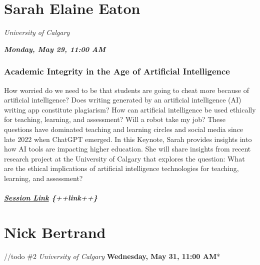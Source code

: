 \documentclass[
]{book}
\begin{document}
\hypertarget{sarah-elaine-eaton}{%
\section*{Sarah Elaine Eaton}\label{sarah-elaine-eaton}}

\emph{University of Calgary}

\textbf{\emph{Monday, May 29, 11:00 AM}}

\begin{keynote}
\hypertarget{academic-integrity-in-the-age-of-artificial-intelligence}{%
\subsubsection*{Academic Integrity in the Age of Artificial
Intelligence}\label{academic-integrity-in-the-age-of-artificial-intelligence}}

How worried do we need to be that students are going to cheat more
because of artificial intelligence? Does writing generated by an
artificial intelligence (AI) writing app constitute plagiarism? How can
artificial intelligence be used ethically for teaching, learning, and
assessment? Will a robot take my job? These questions have dominated
teaching and learning circles and social media since late 2022 when
ChatGPT emerged. In this Keynote, Sarah provides insights into how AI
tools are impacting higher education. She will share insights from
recent research project at the University of Calgary that explores the
question: What are the ethical implications of artificial intelligence
technologies for teaching, learning, and assessment?

\hypertarget{session-link-link}{%
\subparagraph{\texorpdfstring{\href{}{Session Link}
\{++link++\}}{Session Link \{++link++\}}}\label{session-link-link}}
\end{keynote}

\hypertarget{nick-bertrand}{%
\section*{Nick Bertrand}\label{nick-bertrand}}

//todo \#2
\emph{University of Calgary
}\textbf{Wednesday, May 31, 11:00 AM}*
\end{document}
